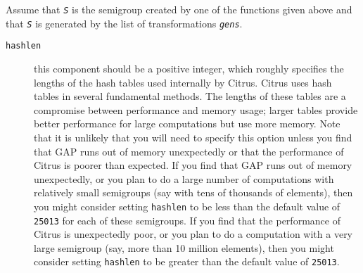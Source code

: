 \documentclass[a4paper,11pt]{report}
\begin{document}
{{ Assume that \mbox{\texttt{\mdseries\slshape S}} is the semigroup created by one of the functions given above and that \mbox{\texttt{\mdseries\slshape S}} is generated by the list of transformations \mbox{\texttt{\mdseries\slshape gens}}. 
\begin{description}
\item[{\texttt{hashlen}}]  this component should be a positive integer, which roughly specifies the
lengths of the hash tables used internally by \textsf{Citrus}. \textsf{Citrus} uses hash tables in several fundamental methods. The lengths of these tables
are a compromise between performance and memory usage; larger tables provide
better performance for large computations but use more memory. Note that it is
unlikely that you will need to specify this option unless you find that \textsf{GAP} runs out of memory unexpectedly or that the performance of \textsf{Citrus} is poorer than expected. If you find that \textsf{GAP} runs out of memory unexpectedly, or you plan to do a large number of
computations with relatively small semigroups (say with tens of thousands of
elements), then you might consider setting \texttt{hashlen} to be less than the default value of \texttt{25013} for each of these semigroups. If you find that the performance of \textsf{Citrus} is unexpectedly poor, or you plan to do a computation with a very large
semigroup (say, more than 10 million elements), then you might consider
setting \texttt{hashlen} to be greater than the default value of \texttt{25013}. 


\end{description}}}
\end{document}
